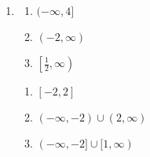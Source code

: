 \documentclass{ximera}
\begin{document}
\begin{enumerate}
\setcounter{enumi}{\value{HW}}

\item 

\begin{multicols}{3}

\begin{enumerate}

\item   $(-\infty, 4]$  \vphantom{$\left[ \frac{1}{2}, \infty \right)$}

\item   $(-2, \infty)$ \vphantom{$\left[ \frac{1}{2}, \infty \right)$}

\item $\left[ \frac{1}{2}, \infty \right)$

\setcounter{HWindent}{\value{enumii}}

\end{enumerate}
\end{multicols}

\begin{multicols}{3}

\begin{enumerate}
\setcounter{enumii}{\value{HWindent}}

\item   $[-2,2]$

\item   $(-\infty, -2) \cup (2, \infty)$

\item   $(-\infty, -2] \cup [1, \infty)$

\end{enumerate}

\end{multicols}

\setcounter{HW}{\value{enumi}}
\end{enumerate}
\end{document}
